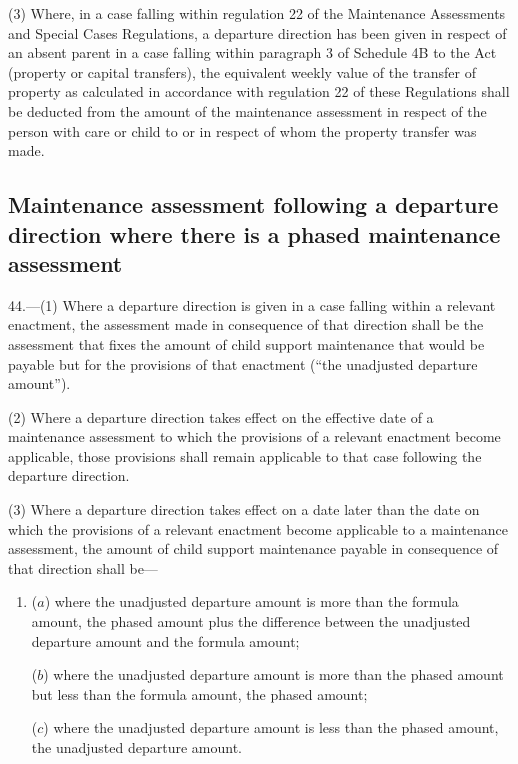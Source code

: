 \documentclass[12pt,a4paper]{article}
\begin{document}
(3) Where, in a case falling within regulation 22 of the Maintenance Assessments
and Special Cases Regulations, a departure direction has been given in respect
of an absent parent in a case falling within paragraph 3 of Schedule 4B to the
Act (property or capital transfers), the equivalent weekly value of the transfer
of property as calculated in accordance with regulation 22 of these Regulations
shall be deducted from the amount of the maintenance assessment in respect of
the person with care or child to or in respect of whom the property transfer was
made.


\subsection[44. Maintenance assessment following a departure direction where there is a phased
maintenance assessment]{\sloppy Maintenance assessment following a departure direction where there is a phased
maintenance assessment}

44.—(1) Where a departure direction is given in a case
falling within a relevant enactment, the assessment made in consequence of that
direction shall be the assessment that fixes the amount of child support
maintenance that would be payable but for the provisions of that enactment (“the
unadjusted departure amount”).

(2) Where a departure direction takes effect on the effective date of a
maintenance assessment to which the provisions of a relevant enactment become
applicable, those provisions shall remain applicable to that case following the
departure direction.

(3) Where a departure direction takes effect on a date later than the date on
which the provisions of a relevant enactment become applicable to a maintenance
assessment, the amount of child support maintenance payable in consequence of
that direction shall be—
\begin{enumerate}\item[]
($a$) where the unadjusted departure amount is more than the formula amount, the
phased amount plus the difference between the unadjusted departure amount and
the formula amount;

($b$) where the unadjusted departure amount is more than the phased amount but less
than the formula amount, the phased amount;

($c$) where the unadjusted departure amount is less than the phased amount, the
unadjusted departure amount.
\end{enumerate}
\end{document}
